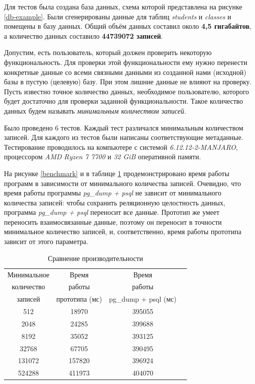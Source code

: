 Для тестов была создана база данных, схема которой представлена на рисунке \ref{db-example}. Были сгенерированы данные для таблиц \textit{students} и \textit{classes} и помещены в базу данных. Общий объём данных составил около \textbf{4,5 гигабайтов}, а количество данных составило \textbf{44739072 записей}.

Допустим, есть пользователь, который должен проверить некоторую функциональность. Для проверки этой функциональности ему нужно перенести конкретные данные со всеми связными данными из созданной нами (исходной) базы в пустую (целевую) базу. При этом лишние данные не влияют на проверку. Пусть известно точное количество данных, необходимое пользователю, которого будет достаточно для проверки заданной функциональности. Такое количество данных будем называть \textit{минимальным количеством записей}.

Было проведено 6 тестов. Каждый тест различался минимальным количеством записей. Для каждого из тестов были написаны соответствующие метаданные. Тестирование проводилось на компьютере с системой \textit{6.12.12-2-MANJARO}, процессором \textit{AMD Ryzen 7 7700} и \textit{32 GiB} оперативной памяти.

На рисунке \ref{benchmark} и в таблице \ref{tab:benchmark} продемонстрировано время работы программ в зависимости от минимального количества записей. Очевидно, что время работы программы \textit{pg\_dump + psql} не зависит от минимального количества записей: чтобы сохранить реляционную целостность данных, программа \textit{pg\_dump + psql} переносит все данные. Прототип же умеет переносить взаимосвязанные данные, поэтому он переносит в точности минимальное количество записей, и, соответственно, время работы прототипа зависит от этого параметра.

\begin{table}[h!]
    \caption{Сравнение производительности}
    \begin{tabular}{|c|c|c|c|}
        \hline
        Минимальное & Время & Время \\
        количество & работы & работы \\
        записей & прототипа (мс) & pg\_dump + psql (мс) \\
        \hline
        512 & 18970 & 395055 \\
        \hline
        2048 & 24285 & 399688 \\
        \hline
        8192 & 35052 & 393125 \\
        \hline
        32768 & 67705 & 390495 \\
        \hline
        131072 & 157820 & 396924 \\
        \hline
        524288 & 411973 & 404070 \\
        \hline
    \end{tabular}
    \label{tab:benchmark}
\end{table}

